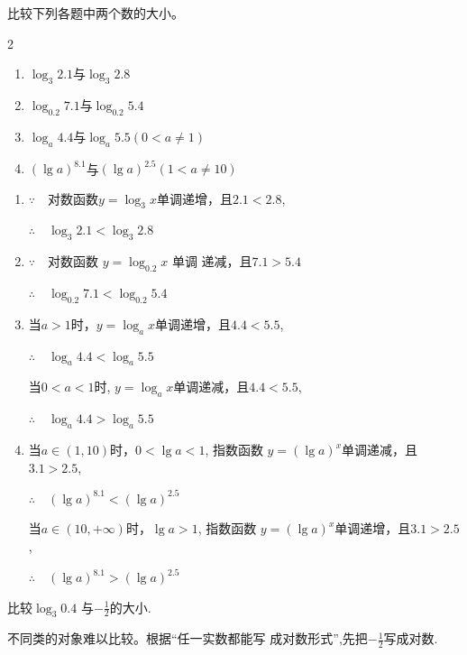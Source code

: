 \begin{example}
    比较下列各题中两个数的大小。
    \begin{multicols}{2}
\begin{enumerate}[(1)]
    \item $\log_3 2.1$与$\log _3 2.8$
    \item $\log_{0.2}7.1$与$\log_{0.2}5.4$
    \item $\log_{a}4.4$与$\log_a 5.5$\quad $(0<a\neq1)$
    \item $(\lg a)^{8.1}$与$(\lg a)^{2.5}$\quad $(1<a\neq10)$
\end{enumerate}        
    \end{multicols}

\end{example}

\begin{solution}
\begin{enumerate}[(1)]
\item $\because \quad $对数函数$y=\log_3 x$单调递增，且$2.1<
2.8$, 

$\therefore\quad \log_3 2.1<\log_3 2.8$
\item $\because\quad $对数函数 $y=\log_{0.2}x$ 单调 递减，且$7.1>
5.4$

$\therefore\quad \log_{0.2}7.1<\log_{0.2}5.4$
\item 当$a>1$时，$y=\log_a x$单调递增，且$4.4<5.5$,

$\therefore\quad \log_a 4.4< \log _{a}5.5$

当$0<a<1$时, $y=\log_a x$单调递减，且$4.4<5.5$,

$\therefore \quad \log_a 4.4> \log_a 5.5$
\item 当$a\in(1,10)$时，$0<\lg a<1$, 指数函数
$y=(\lg a)^{x}$单调递减，且$3.1>2.5$,

$\therefore\quad (\lg a)^{8.1}<(\lg a)^{2.5}$

当$a\in(10,+\infty)$时，$\lg a>1$, 指数函数
$y=(\lg a)^{x}$单调递增，且$3.1>2.5$,

$\therefore\quad (\lg a)^{8.1}>(\lg a)^{2.5}$
\end{enumerate}
\end{solution}

\begin{example}
 比较$\log_3 0.4$ 与$-\frac12$的大小.   
\end{example}

\begin{analyze}
    不同类的对象难以比较。根据“任一实数都能写
成对数形式”,先把$-\frac12$写成对数.
\end{analyze}

